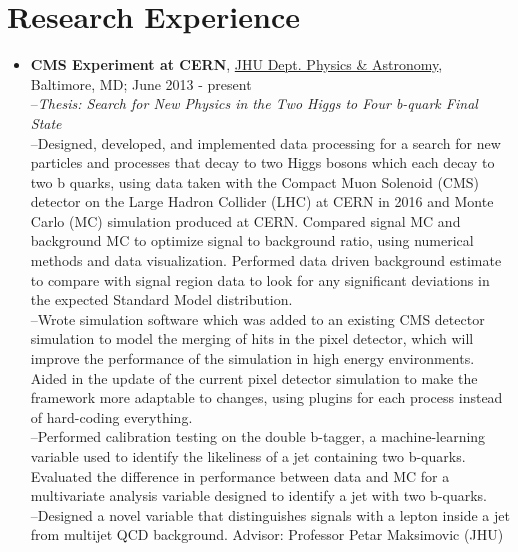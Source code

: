 \section*{ Research Experience}
\begin{itemize}
\item{\textbf{CMS Experiment at CERN}, \href{http://physics-astronomy.jhu.edu/research/particle-physics/}{JHU Dept. Physics \& Astronomy}, Baltimore, MD; June 2013 - present\\
--\textit{Thesis: Search for New Physics in the Two Higgs to Four b-quark Final State} \\
--Designed, developed, and implemented data processing for a search for new particles and processes that decay to two Higgs bosons which each decay to two b quarks, using data taken with the Compact Muon Solenoid (CMS) detector on the Large Hadron Collider (LHC) at CERN in 2016 and Monte Carlo (MC) simulation produced at CERN. Compared signal MC and background MC to optimize signal to background ratio, using numerical methods and data visualization. Performed data driven background estimate to compare with signal region data to look for any significant deviations in the expected Standard Model distribution.\\
--Wrote simulation software which was added to an existing CMS detector simulation to model the merging of hits in the pixel detector, which will improve the performance of the simulation in high energy environments. Aided in the update of the current pixel detector simulation to make the framework more adaptable to changes, using plugins for each process instead of hard-coding everything.\\
--Performed calibration testing on the double b-tagger, a machine-learning variable  used to identify the likeliness of a jet containing two b-quarks. Evaluated the difference in performance between data and MC for a multivariate analysis variable designed to identify a jet with two b-quarks.\\
--Designed a novel variable that distinguishes signals with a lepton inside a jet from multijet QCD background. Advisor: Professor Petar Maksimovic (JHU)\\
}

\end{itemize}
